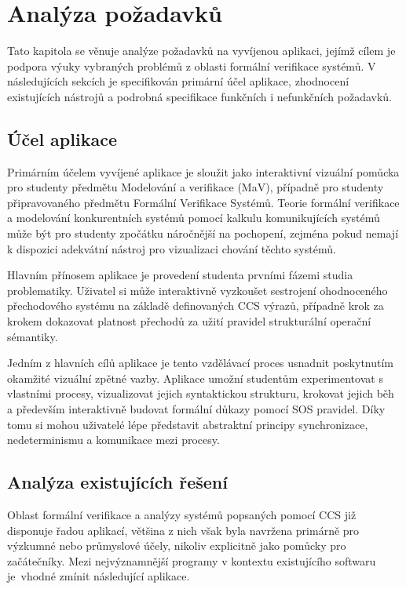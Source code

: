 \chapter{Analýza požadavků}
\label{sec:analyza_pozadavku}

Tato kapitola se věnuje analýze požadavků na vyvíjenou aplikaci, jejímž cílem je podpora výuky vybraných problémů z oblasti formální verifikace systémů. 
V následujících sekcích je specifikován primární účel aplikace, zhodnocení existujících nástrojů a podrobná specifikace funkčních i nefunkčních požadavků.

\section{Účel aplikace}
\label{sec:ucel_aplikace}
Primárním účelem vyvíjené aplikace je sloužit jako interaktivní vizuální pomůcka pro studenty předmětu Modelování a verifikace (MaV), případně pro studenty připravovaného předmětu Formální Verifikace Systémů. 
Teorie formální verifikace a modelování konkurentních systémů pomocí kalkulu komunikujících systémů může být pro studenty zpočátku náročnější na pochopení, zejména pokud nemají k dispozici adekvátní nástroj pro vizualizaci chování těchto systémů. 

Hlavním přínosem aplikace je provedení studenta prvními fázemi studia problematiky. 
Uživatel si může interaktivně vyzkoušet sestrojení ohodnoceného přechodového systému na základě definovaných CCS výrazů, případně krok za krokem dokazovat platnost přechodů za užití pravidel strukturální operační sémantiky.

Jedním z hlavních cílů aplikace je tento vzdělávací proces usnadnit poskytnutím okamžité vizuální zpětné vazby. 
Aplikace umožní studentům experimentovat s vlastními procesy, vizualizovat jejich syntaktickou strukturu, krokovat jejich běh a především interaktivně budovat formální důkazy pomocí SOS pravidel. 
Díky tomu si mohou uživatelé lépe představit abstraktní principy synchronizace, nedeterminismu a komunikace mezi procesy.

\section{Analýza existujících řešení}
\label{sec:analyza_existujicich_reseni}
Oblast formální verifikace a analýzy systémů popsaných pomocí CCS již disponuje řadou aplikací, 
většina z nich však byla navržena primárně pro výzkumné nebo průmyslové účely, nikoliv explicitně jako pomůcky pro začátečníky. 
Mezi nejvýznamnější programy v kontextu existujícího softwaru je~vhodné zmínit následující aplikace.

